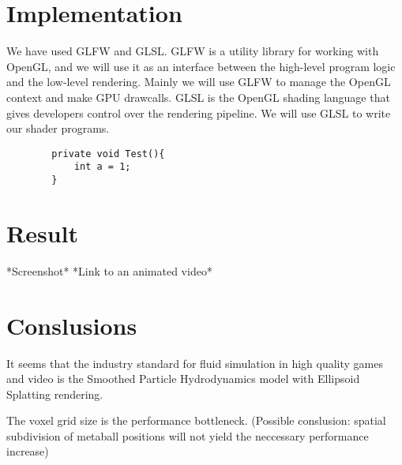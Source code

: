\documentclass{article}
\begin{document}
    \section{Implementation}

        We have used GLFW and GLSL. GLFW is a utility library for working with OpenGL, and we will use it as an interface between the high-level program logic and the low-level rendering. Mainly we will use GLFW to manage the OpenGL context and make GPU drawcalls. GLSL is the OpenGL shading language that gives developers control over the rendering pipeline. We will use GLSL to write our shader programs.

        \begin{lstlisting}
        private void Test(){
            int a = 1;
        }
        \end{lstlisting}

    \section{Result}
        *Screenshot*
        *Link to an animated video*

    \section{Conslusions}
    
    	It seems that the industry standard for fluid simulation in high quality games and video is the Smoothed Particle Hydrodynamics model with Ellipsoid Splatting rendering.

        The voxel grid size is the performance bottleneck.
        (Possible conslusion: spatial subdivision of metaball positions will not yield the neccessary performance increase)
\end{document}
